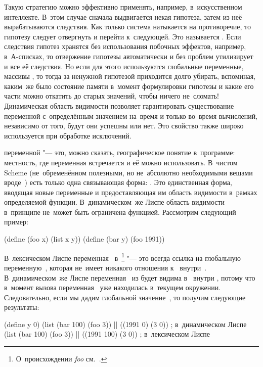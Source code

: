 Такую стратегию можно эффективно применять, например, в~искусственном
интеллекте. В~этом случае сначала выдвигается некая гипотеза, затем из неё
вырабатываются следствия. Как только система натыкается на противоречие, то
гипотезу следует отвергнуть и перейти к~следующей. Это называется . Если следствия гипотез хранятся без использования побочных
эффектов, например, в~А-списках, то отвержение гипотезы автоматически и без
проблем утилизирует и все её следствия. Но если для этого используются
глобальные переменные, массивы {\itd}, то тогда за ненужной гипотезой
приходится долго убирать, вспоминая, каким~же было состояние памяти в~момент
формулировки гипотезы и какие его части можно откатить до старых значений, чтобы
ничего не~сломать! Динамическая область видимости позволяет гарантировать
существование переменной с~определённым значением на~время и только во~время
вычислений, независимо от того, будут они успешны или нет. Это свойство также
широко используется при обработке исключений.

 переменной "--- это, можно сказать, географическое
понятие в~программе: местность, где переменная встречается и её можно
использовать. В~чистом Scheme (не~обременённом полезными, но не~абсолютно
необходимыми вещами вроде~) есть только одна связывающая форма:
. Это единственная форма, вводящая новые переменные и предоставляющая
им область видимости в~рамках определяемой функции. В~динамическом~же Лиспе
область видимости в~принципе не~может быть ограничена функцией. Рассмотрим
следующий пример:

\begin{code:lisp}
(define (foo x) (list x y))
(define (bar y) (foo 1991))
\end{code:lisp}

В~лексическом Лиспе переменная~ в~\footnote{О~происхождении
\emph{foo} см.~\cite{ray91}.} "--- это всегда ссылка на глобальную
переменную~, которая не~имеет никакого отношения к~ внутри~.
В~динамическом~же Лиспе переменная~ из  будет видима в~
внутри , потому что в~момент вызова  переменная~ уже
находилась в~текущем окружении. Следовательно, если мы дадим глобальной 
значение~, то получим следующие результаты:

\begin{code:lisp}
(define y 0)
(list (bar 100) (foo 3)) |\is| ((1991 0) (3 0))   ; в~динамическом Лиспе
(list (bar 100) (foo 3)) |\is| ((1991 100) (3 0)) ; в~лексическом Лиспе
\end{code:lisp}

